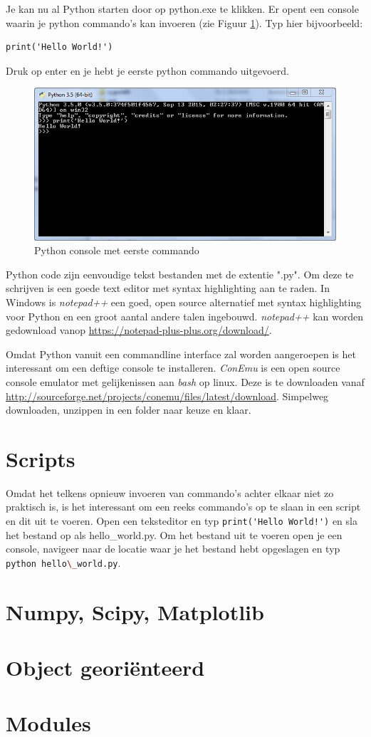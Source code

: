 \documentclass[11pt,twoside]{article}
\begin{document}
Je kan nu al Python starten door op python.exe te klikken. Er opent een console waarin je python commando's kan invoeren (zie Figuur \ref{Python35_(64-bit)}). Typ hier bijvoorbeeld:
\begin{lstlisting}
print('Hello World!')
\end{lstlisting}

Druk op enter en je hebt je eerste python commando uitgevoerd.
\begin{figure}[htp]
	\centering
	\includegraphics[scale=0.5]{Python35_(64-bit)}
	\caption{Python console met eerste commando}
	\label{Python35_(64-bit)}
\end{figure}

Python code zijn eenvoudige tekst bestanden met de extentie "\textsf{.py}". Om deze te schrijven is een goede text editor met syntax highlighting aan te raden. In Windows is \emph{notepad++} een goed, open source alternatief met syntax highlighting voor Python en een groot aantal andere talen ingebouwd. \emph{notepad++} kan worden gedownload vanop \url{https://notepad-plus-plus.org/download/}.

Omdat Python vanuit een commandline interface zal worden aangeroepen is het interessant om een deftige console te installeren. \emph{ConEmu} is een open source console emulator met gelijkenissen aan \emph{bash} op linux. Deze is te downloaden vanaf \url{http://sourceforge.net/projects/conemu/files/latest/download}. Simpelweg downloaden, unzippen in een folder naar keuze en klaar.

 	\section{Scripts}
Omdat het telkens opnieuw invoeren van commando's achter elkaar niet zo praktisch is, is het interessant om een reeks commando's op te slaan in een script en dit uit te voeren. Open een teksteditor en typ \lstinline{print('Hello World!')} en sla het bestand op als \textsf{hello\_world.py}. Om het bestand uit te voeren open je een console, navigeer naar de locatie waar je het bestand hebt opgeslagen en typ \lstinline[language=bash]{python hello\_world.py}.



	\section{Numpy, Scipy, Matplotlib} 
		
	\section{Object georiënteerd} 
	
 	\section{Modules}
\end{document}
